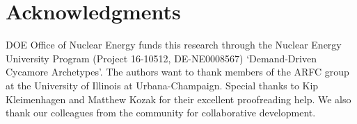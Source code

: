 \section{Acknowledgments}
\gls{DOE} Office of Nuclear Energy funds this research through 
the  Nuclear Energy University Program (Project 16-10512, DE-NE0008567) 
`Demand-Driven Cycamore Archetypes'. The authors want to thank 
members of the \gls{ARFC} group at the University of Illinois at 
Urbana-Champaign. 
Special thanks to Kip Kleimenhagen and Matthew Kozak 
for their excellent proofreading help. 
We also thank our colleagues from the \Cyclus community
for collaborative \Cyclus development.